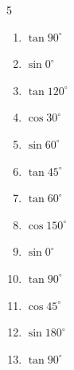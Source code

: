 \begin{multicols}{5}
\begin{enumerate}
\resetques

  \item $\displaystyle \tan{90^\circ}$

        \phantom{$\displaystyle なし$}

  \item $\displaystyle \sin{0^\circ}$

        \phantom{$\displaystyle =0$}

  \item $\displaystyle \tan{120^\circ}$


  \item $\displaystyle \cos{30^\circ}$


  \item $\displaystyle \sin{60^\circ}$


  \item $\displaystyle \tan{45^\circ}$

        \phantom{$\displaystyle =1$}

  \item $\displaystyle \tan{60^\circ}$


  \item $\displaystyle \cos{150^\circ}$


  \item $\displaystyle \sin{0^\circ}$

        \phantom{$\displaystyle =0$}

  \item $\displaystyle \tan{90^\circ}$

        \phantom{$\displaystyle なし$}

  \item $\displaystyle \cos{45^\circ}$


  \item $\displaystyle \sin{180^\circ}$

        \phantom{$\displaystyle =0$}

  \item $\displaystyle \tan{90^\circ}$


\end{enumerate}
\end{multicols}
